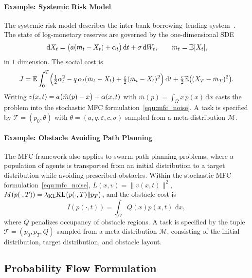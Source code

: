 \documentclass[preprint]{elsarticle}
\newcommand{\dd}{\,\mathrm{d}}          \newcommand{\pdv}[2]{\dfrac{\partial #1}{\partial #2}}
\newcommand{\E}{\mathbb{E}}
\renewcommand{\l}{\lambda}
\begin{document}
\paragraph{Example: Systemic Risk Model}
The systemic risk model describes the inter-bank borrowing--lending system~\cite{carmona2015systemic}. The state of log-monetary reserves are governed by the one-dimensional SDE
\begin{equation}\label{eq:Sysrisk_state}
\dd X_t = \qb{a(\bar m_t-X_t)+\alpha_t}\dd t+\sigma\dd W_t,
\qquad
\bar m_t=\E[X_t],
\end{equation}
in $1$ dimension. The social cost is
\begin{equation}\label{eq:Sysrisk_cost}
J=\E\int_0^T\qB{\tfrac12\alpha_t^2-q\,\alpha_t(\bar m_t-X_t)
+\tfrac{\varepsilon}{2}(\bar m_t-X_t)^2}\dd t
+\tfrac{c}{2}\E\qb{(X_T-\bar m_T)^2}.
\end{equation}
Writing $v(x,t)=a\bigl(\bar m(p)-x\bigr)+\alpha(x,t)$ with $\bar m(p)=\int_\Omega x\,p(x)\dd x$ casts the problem into the stochastic MFC formulation~\eqref{equ:mfc_noise}. A task is specified by $\mathcal T=(p_0,\theta)$ with $\theta=(a,q,\varepsilon,c,\sigma)$ sampled from a meta-distribution $\mathcal M$.

\paragraph{Example: Obstacle Avoiding Path Planning}
The MFC framework also applies to swarm path-planning problems, where a population of agents is transported from an initial distribution to a target distribution while avoiding prescribed obstacles. Within the stochastic MFC formulation~\eqref{equ:mfc_noise}, $L(x,v) = \|v(x,t)\|^2$, $M(p(\cdot,T)) = \l_{\mathrm{KL}}\mathrm{KL}\qb{p(\cdot,T) \| p_T}$, and the obstacle cost is
\[
I(p(\cdot,t)) = \int_\Omega Q(x)p(x,t)\,\dd x,
\]
where $Q$ penalizes occupancy of obstacle regions. A task is specified by the tuple $\mathcal T=(p_0,p_T,Q)$ sampled from a meta-distribution $\mathcal M$, consisting of the initial distribution, target distribution, and obstacle layout.


\subsection{Probability Flow Formulation}\label{sec:change_of_variable}
\end{document}
